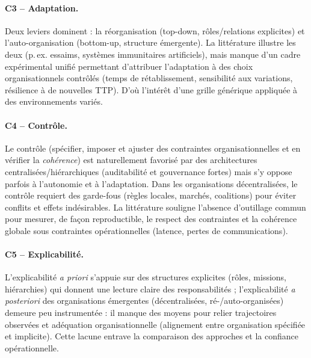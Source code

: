 \paragraph{C3 -- Adaptation.}
Deux leviers dominent : la réorganisation (top-down, rôles/relations explicites) et l'auto-organisation (bottom-up, structure émergente). La littérature illustre les deux (p.\,ex. essaims, systèmes immunitaires artificiels), mais manque d'un cadre expérimental unifié permettant d'attribuer l'adaptation à des choix organisationnels contrôlés (temps de rétablissement, sensibilité aux variations, résilience à de nouvelles TTP). D'où l'intérêt d'une grille générique appliquée à des environnements variés.

\paragraph{C4 -- Contrôle.}
Le contrôle (spécifier, imposer et ajuster des contraintes organisationnelles et en vérifier la \emph{cohérence}) est naturellement favorisé par des architectures centralisées/hiérarchiques (auditabilité et gouvernance fortes) mais s'y oppose parfois à l'autonomie et à l'adaptation. Dans les organisations décentralisées, le contrôle requiert des garde-fous (règles locales, marchés, coalitions) pour éviter conflits et effets indésirables. La littérature souligne l'absence d'outillage commun pour mesurer, de façon reproductible, le respect des contraintes et la cohérence globale sous contraintes opérationnelles (latence, pertes de communications).

\paragraph{C5 -- Explicabilité.}
L'explicabilité \emph{a priori} s'appuie sur des structures explicites (rôles, missions, hiérarchies) qui donnent une lecture claire des responsabilités ; l'explicabilité \emph{a posteriori} des organisations émergentes (décentralisées, ré-/auto-organisées) demeure peu instrumentée : il manque des moyens pour relier trajectoires observées et adéquation organisationnelle (alignement entre organisation spécifiée et implicite). Cette lacune entrave la comparaison des approches et la confiance opérationnelle.

